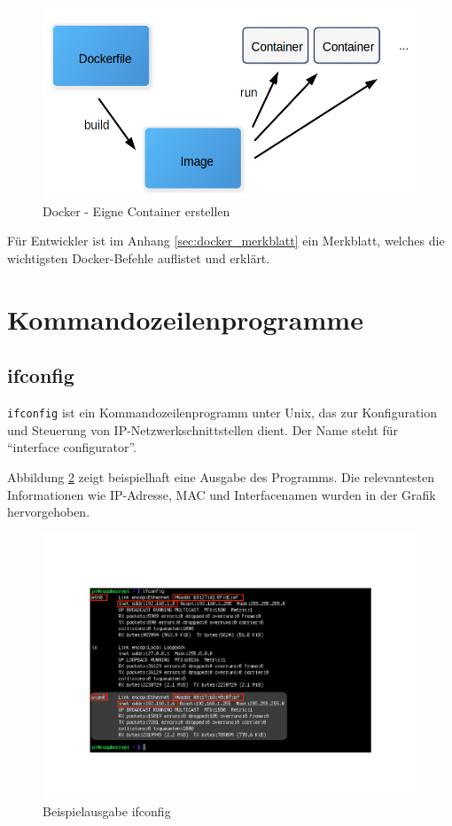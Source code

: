\begin{figure}[H]
	\centering
    \includegraphics[width=\textwidth]{images/tools/Docker_Build_Prozess}
    \caption{Docker - Eigne Container erstellen}
    \label{img:tools_docker_build_container}
\end{figure}

Für Entwickler ist im Anhang \ref{sec:docker_merkblatt} ein Merkblatt, welches die wichtigsten Docker-Befehle auflistet und erklärt. 

\section{Kommandozeilenprogramme}
\subsection{ifconfig}

\colorbox{altgray}{\lstinline|ifconfig|} ist ein Kommandozeilenprogramm unter Unix, das zur Konfiguration und Steuerung von IP-Netzwerkschnittstellen dient. Der Name steht für \enquote{interface configurator}.

Abbildung \ref{img:ifconfig} zeigt beispielhaft eine Ausgabe des Programms. Die relevantesten Informationen wie IP-Adresse, MAC und Interfacenamen wurden in der Grafik hervorgehoben.

\begin{figure}[H]
	\centering
	\includegraphics[width=1\textwidth]{images/tools/ifconfig.pdf}
	\caption{Beispielausgabe ifconfig}
	\label{img:ifconfig}
\end{figure}

